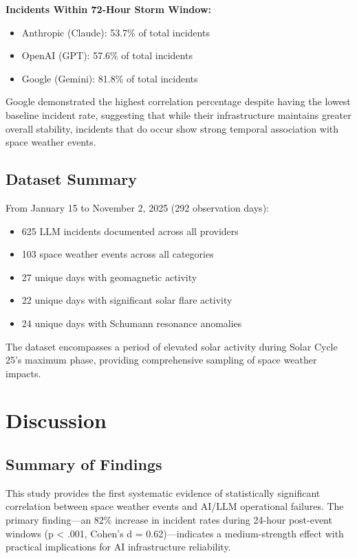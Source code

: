 \documentclass[11pt,a4paper]{article}
\begin{document}
\textbf{Incidents Within 72-Hour Storm Window:}
\begin{itemize}
\item Anthropic (Claude): 53.7\% of total incidents
\item OpenAI (GPT): 57.6\% of total incidents
\item Google (Gemini): 81.8\% of total incidents
\end{itemize}

Google demonstrated the highest correlation percentage despite having the lowest baseline incident rate, suggesting that while their infrastructure maintains greater overall stability, incidents that do occur show strong temporal association with space weather events.

\subsection{Dataset Summary}
From January 15 to November 2, 2025 (292 observation days):
\begin{itemize}
\item 625 LLM incidents documented across all providers
\item 103 space weather events across all categories
\item 27 unique days with geomagnetic activity
\item 22 unique days with significant solar flare activity
\item 24 unique days with Schumann resonance anomalies
\end{itemize}

The dataset encompasses a period of elevated solar activity during Solar Cycle 25's maximum phase, providing comprehensive sampling of space weather impacts.

\section{Discussion}

\subsection{Summary of Findings}
This study provides the first systematic evidence of statistically significant correlation between space weather events and AI/LLM operational failures. The primary finding---an 82\% increase in incident rates during 24-hour post-event windows (p < .001, Cohen's d = 0.62)---indicates a medium-strength effect with practical implications for AI infrastructure reliability.
\end{document}
